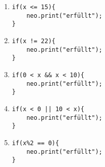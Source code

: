 \begin{questions}
\begin{parts}
\begin{solution}
\begin{enumerate}[label=(\roman*)]
            \item \begin{lstlisting}
if(x <= 15){
    neo.print("erfüllt");
}
                   \end{lstlisting}

            \item \begin{lstlisting}
if(x != 22){
    neo.print("erfüllt");
}
                   \end{lstlisting}

            \item \begin{lstlisting}
if(0 < x && x < 10){
    neo.print("erfüllt");
}
                   \end{lstlisting}

\item \begin{lstlisting}
if(x < 0 || 10 < x){
    neo.print("erfüllt");
}
                   \end{lstlisting}

                   \item \begin{lstlisting}
if(x%2 == 0){
    neo.print("erfüllt");
}
                   \end{lstlisting}
            \end{enumerate}

                \end{solution}
        \end{parts}

    \renewcommand{\workingtimeMinutes}{30}
\end{questions}
